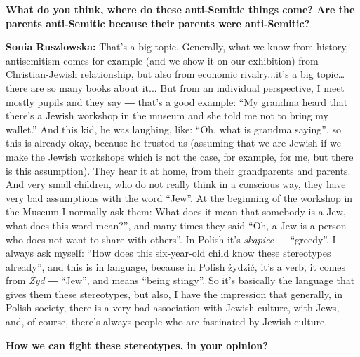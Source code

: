 \textbf{What do you think, where do these anti-Semitic things come? Are the parents anti-Semitic because their parents were anti-Semitic?} 

\textbf{Sonia Ruszlowska:} That’s a big topic. Generally, what we know from history, antisemitism comes for example (and we show it on our exhibition) from Christian-Jewish relationship, but also from economic rivalry...it’s a big topic… there are so many books about it... But from an individual perspective, I meet mostly pupils and they say ― that’s a good example: ``My grandma heard that there’s a Jewish workshop in the museum and she told me not to bring my wallet.'' And this kid, he was laughing, like: ``Oh, what is grandma saying'', so this is already okay, because he trusted us (assuming that we are Jewish if we make the Jewish workshops which is not the case, for example, for me, but there is this assumption). They hear it at home, from their grandparents and parents. And very small children, who do not really think in a conscious way, they have very bad assumptions with the word ``Jew''. At the beginning of the workshop in the Museum I normally ask them: What does it mean that somebody is a Jew, what does this word mean?”, and many times they said ``Oh, a Jew is a person who does not want to share with others''. In Polish it’s \textit{skąpiec} ― ``greedy''. I always ask myself: ``How does this six-year-old child know these stereotypes already'', and this is in language, because in Polish żydzić, it’s a verb, it comes from \textit{Żyd} ― ``Jew'', and means ``being stingy''. So it’s basically the language that gives them these stereotypes, but also, I have the impression that generally, in Polish society, there is a very bad association with Jewish culture, with Jews, and, of course, there’s always people who are fascinated by Jewish culture. 

\textbf{How we can fight these stereotypes, in your opinion?}

